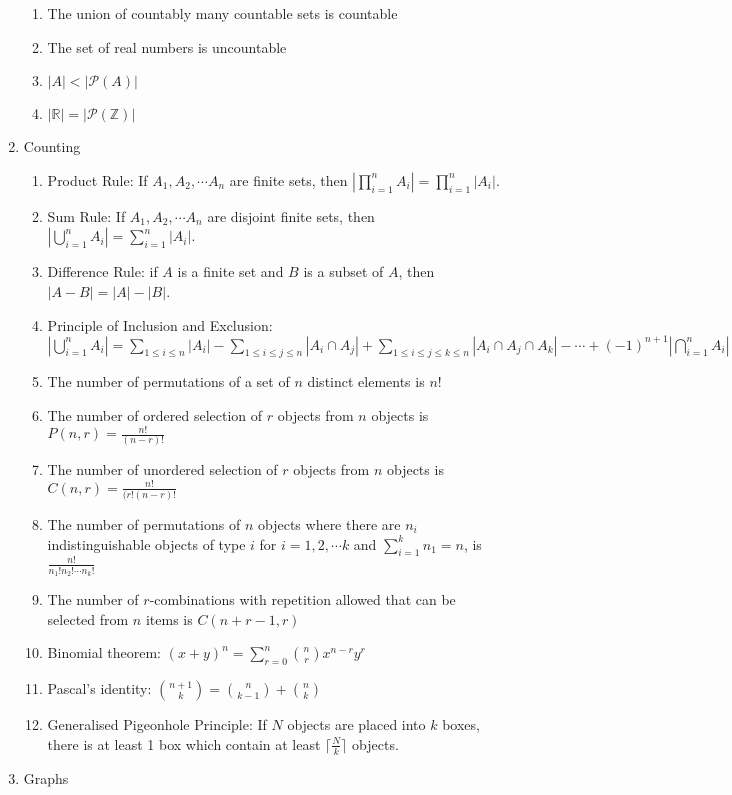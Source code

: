 \documentclass[11pt, twocolumn]{article}
\theoremstyle{definition} \newtheorem*{solution}{Solution}
\begin{document}
\begin{enumerate}
\begin{enumerate}
\item The union of countably many countable sets is countable
\item The set of real numbers is uncountable
\item $|A|<|\mathcal{P}(A)|$
\item $|\mathbb{R}|=|\mathcal{P}(\mathbb{Z})|$
\end{enumerate}
\item Counting
\begin{enumerate}
\item Product Rule: If $A_1, A_2, \cdots A_n$ are finite sets, then $|\prod_{i=1}^n A_i| = \prod_{i=1}^n|A_i|$.
\item Sum Rule: If $A_1, A_2, \cdots A_n$ are disjoint finite sets, then $|\bigcup_{i=1}^n A_i| = \sum_{i=1}^n|A_i|$.
\item Difference Rule: if $A$ is a finite set and $B$ is a subset of $A$, then $|A-B| = |A|-|B|$.
\item Principle of Inclusion and Exclusion: $|\bigcup_{i=1}^n A_i| = \sum_{1\leq i\leq n}|A_i|-\sum_{1\leq i\leq j\leq n}|A_i\cap A_j|+\sum_{1\leq i\leq j \leq k \leq n}|A_i\cap A_j\cap A_k|-\cdots +(-1)^{n+1}|\bigcap_{i=1}^n A_i|$
\item The number of permutations of a set of $n$ distinct elements is $n!$
\item The number of ordered selection of $r$ objects from $n$ objects is $P(n, r)=\frac{n!}{(n-r)!}$
\item The number of unordered selection of $r$ objects from $n$ objects is $C(n,r) = \frac{n!}{(r!(n-r)!}$
\item The number of permutations of $n$ objects where there are $n_i$ indistinguishable objects of type $i$ for $i=1, 2, \cdots k$ and $\sum_{i=1}^{k} n_1 = n$, is $\frac{n!}{n_1!n_2!\cdots n_k!}$ 
\item The number of $r$-combinations with repetition allowed that can be selected from $n$ items is $C(n+r-1, r)$
\item Binomial theorem: $(x+y)^n = \sum^n_{r=0} \binom{n}{r}x^{n-r}y^r$
\item Pascal's identity: $\binom{n+1}{k} = \binom{n}{k-1} + \binom{n}{k}$
\item Generalised Pigeonhole Principle: If $N$ objects are placed into $k$ boxes, there is at least 1 box which contain at least $\lceil \frac{N}{k} \rceil$ objects.
\end{enumerate}
\item Graphs
\begin{enumerate}

\end{enumerate}
\end{enumerate}
\end{document}
